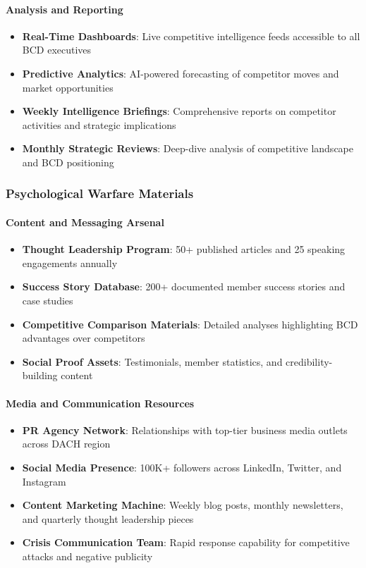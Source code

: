 \paragraph{Analysis and Reporting}
\begin{itemize}
    \item \textbf{Real-Time Dashboards}: Live competitive intelligence feeds accessible to all BCD executives
    \item \textbf{Predictive Analytics}: AI-powered forecasting of competitor moves and market opportunities
    \item \textbf{Weekly Intelligence Briefings}: Comprehensive reports on competitor activities and strategic implications
    \item \textbf{Monthly Strategic Reviews}: Deep-dive analysis of competitive landscape and BCD positioning
\end{itemize}

\subsubsection{Psychological Warfare Materials}

\paragraph{Content and Messaging Arsenal}
\begin{itemize}
    \item \textbf{Thought Leadership Program}: 50+ published articles and 25 speaking engagements annually
    \item \textbf{Success Story Database}: 200+ documented member success stories and case studies
    \item \textbf{Competitive Comparison Materials}: Detailed analyses highlighting BCD advantages over competitors
    \item \textbf{Social Proof Assets}: Testimonials, member statistics, and credibility-building content
\end{itemize}

\paragraph{Media and Communication Resources}
\begin{itemize}
    \item \textbf{PR Agency Network}: Relationships with top-tier business media outlets across DACH region
    \item \textbf{Social Media Presence}: 100K+ followers across LinkedIn, Twitter, and Instagram
    \item \textbf{Content Marketing Machine}: Weekly blog posts, monthly newsletters, and quarterly thought leadership pieces
    \item \textbf{Crisis Communication Team}: Rapid response capability for competitive attacks and negative publicity
\end{itemize}

